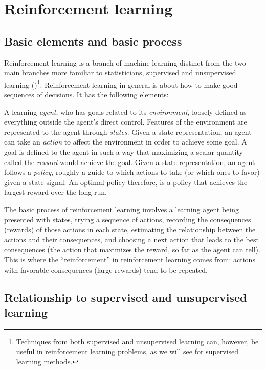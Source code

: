 \documentclass[12pt]{article}
\begin{document}

\section{Reinforcement learning} %
\label{sec:reinforcement_learning}

\subsection{Basic elements and basic process} %
\label{sub:basic_process}

Reinforcement learning is a branch of machine learning distinct from the two main branches more familiar to statisticians, supervised and unsupervised learning (\cite{Sutton2016})\footnote{Techniques from both supervised and unsupervised learning can, however, be useful in reinforcement learning problems, as we will see for supervised learning methods.}. Reinforcement learning in general is about how to make good sequences of decisions. It has the following elements:

A learning \emph{agent}, who has goals related to its \emph{environment}, loosely defined as everything outside the agent's direct control. Features of the environment are represented to the agent through \emph{states}. Given a state representation, an agent can take an \emph{action} to affect the environment in order to achieve some goal. A goal is defined to the agent in such a way that maximizing a scalar quantity called the \emph{reward} would achieve the goal. Given a state representation, an agent follows a \emph{policy}, roughly a guide to which actions to take (or which ones to favor) given a state signal. An optimal policy therefore, is a policy that achieves the largest reward over the long run.

The basic process of reinforcement learning involves a learning agent being presented with states, trying a sequence of actions, recording the consequences (rewards) of those actions in each state, estimating the relationship between the actions and their consequences, and choosing a next action that leads to the best consequences (the action that maximizes the reward, so far as the agent can tell). This is where the ``reinforcement'' in reinforcement learning comes from: actions with favorable consequences (large rewards) tend to be repeated.


\subsection{Relationship to supervised and unsupervised learning} %
\label{sub:relationship_to_supervise_and_unsupervised_learning}
\end{document}
